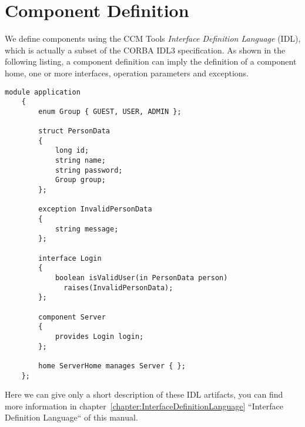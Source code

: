 \section{Component Definition}
\label{section:ComponentDefinition}

We define components using the CCM Tools {\it Interface Definition Language}
(IDL), which is actually a subset of the CORBA IDL3 specification.
As shown in the following listing, a component definition can imply the
definition of a component home, one or more interfaces, operation parameters and
exceptions. 

\begin{footnotesize}
\begin{lstlisting}[language=IDL]
    module application
    {
        enum Group { GUEST, USER, ADMIN };

        struct PersonData
        {
            long id;
            string name;
            string password;
            Group group;
        };

        exception InvalidPersonData
        {
            string message;
        };

        interface Login
        {
            boolean isValidUser(in PersonData person)
              raises(InvalidPersonData);
        };

        component Server
        {
            provides Login login; 
        };

        home ServerHome manages Server { };
    };
\end{lstlisting}
\end{footnotesize}

\newpage

Here we can give only a short description of these IDL artifacts, you can find 
more information in chapter~\ref{chapter:InterfaceDefinitionLanguage} 
``Interface Definition Language`` of this manual.

